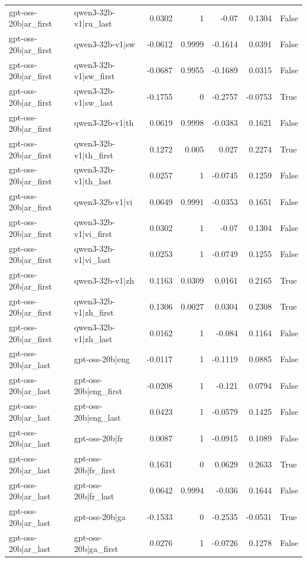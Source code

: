 \begin{table}
\begin{tabular}{l l r r r r l}
gpt-oss-20b|ar_first & qwen3-32b-v1|ru_last & 0.0302 & 1 & -0.07 & 0.1304 & False \\
gpt-oss-20b|ar_first & qwen3-32b-v1|sw & -0.0612 & 0.9999 & -0.1614 & 0.0391 & False \\
gpt-oss-20b|ar_first & qwen3-32b-v1|sw_first & -0.0687 & 0.9955 & -0.1689 & 0.0315 & False \\
gpt-oss-20b|ar_first & qwen3-32b-v1|sw_last & -0.1755 & 0 & -0.2757 & -0.0753 & True \\
gpt-oss-20b|ar_first & qwen3-32b-v1|th & 0.0619 & 0.9998 & -0.0383 & 0.1621 & False \\
gpt-oss-20b|ar_first & qwen3-32b-v1|th_first & 0.1272 & 0.005 & 0.027 & 0.2274 & True \\
gpt-oss-20b|ar_first & qwen3-32b-v1|th_last & 0.0257 & 1 & -0.0745 & 0.1259 & False \\
gpt-oss-20b|ar_first & qwen3-32b-v1|vi & 0.0649 & 0.9991 & -0.0353 & 0.1651 & False \\
gpt-oss-20b|ar_first & qwen3-32b-v1|vi_first & 0.0302 & 1 & -0.07 & 0.1304 & False \\
gpt-oss-20b|ar_first & qwen3-32b-v1|vi_last & 0.0253 & 1 & -0.0749 & 0.1255 & False \\
gpt-oss-20b|ar_first & qwen3-32b-v1|zh & 0.1163 & 0.0309 & 0.0161 & 0.2165 & True \\
gpt-oss-20b|ar_first & qwen3-32b-v1|zh_first & 0.1306 & 0.0027 & 0.0304 & 0.2308 & True \\
gpt-oss-20b|ar_first & qwen3-32b-v1|zh_last & 0.0162 & 1 & -0.084 & 0.1164 & False \\
gpt-oss-20b|ar_last & gpt-oss-20b|eng & -0.0117 & 1 & -0.1119 & 0.0885 & False \\
gpt-oss-20b|ar_last & gpt-oss-20b|eng_first & -0.0208 & 1 & -0.121 & 0.0794 & False \\
gpt-oss-20b|ar_last & gpt-oss-20b|eng_last & 0.0423 & 1 & -0.0579 & 0.1425 & False \\
gpt-oss-20b|ar_last & gpt-oss-20b|fr & 0.0087 & 1 & -0.0915 & 0.1089 & False \\
gpt-oss-20b|ar_last & gpt-oss-20b|fr_first & 0.1631 & 0 & 0.0629 & 0.2633 & True \\
gpt-oss-20b|ar_last & gpt-oss-20b|fr_last & 0.0642 & 0.9994 & -0.036 & 0.1644 & False \\
gpt-oss-20b|ar_last & gpt-oss-20b|ga & -0.1533 & 0 & -0.2535 & -0.0531 & True \\
gpt-oss-20b|ar_last & gpt-oss-20b|ga_first & 0.0276 & 1 & -0.0726 & 0.1278 & False \\

\end{tabular}
\end{table}
